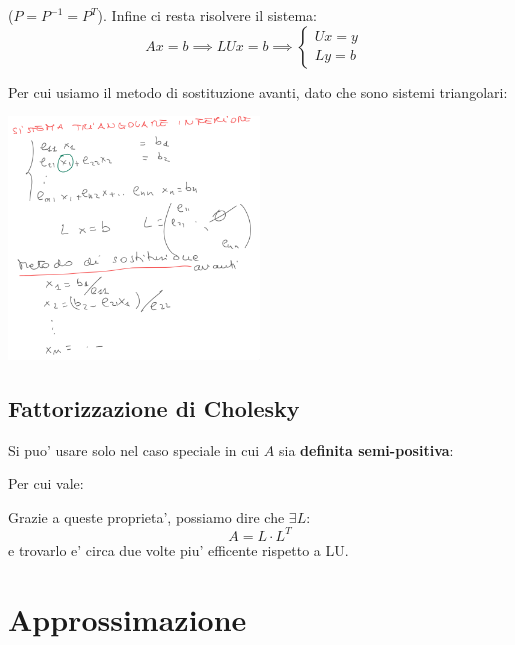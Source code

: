 \documentclass{report}
\begin{document}
($ P = P^{-1} = P^{T} $). Infine ci resta risolvere il sistema:
\[
Ax = b \implies LUx = b \implies \begin{cases}
Ux = y & \\
Ly = b & 
\end{cases}
\]

Per cui usiamo il metodo di sostituzione avanti, dato che sono sistemi triangolari:
\begin{center}
  \includegraphics[width=0.5\textwidth]{img/2024-10-14-16-43-56.png}
\end{center}
\subsection{Fattorizzazione di Cholesky}
Si puo' usare solo nel caso speciale in cui $ A $ sia \textbf{definita semi-positiva}:

Per cui vale:

Grazie a queste proprieta', possiamo dire che $ \exists L: $
\[
A = L \cdot L^T
\]
e trovarlo e' circa due volte piu' efficente rispetto a LU.

\section{Approssimazione}
\end{document}
